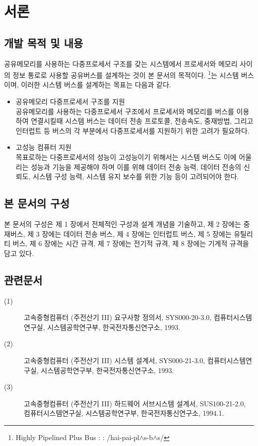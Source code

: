\section{서론}
\subsection{개발 목적 및 내용}
공유메모리를 사용하는 다중프로세서 구조를 갖는 시스템에서 프로세서와 메모리 사이의
정보 통로로 사용할 공유버스를 설계하는 것이 본 문서의 목적이다.
\HB\footnote{Highly Pipelined Plus Bus : \HB :
/hai-pai-pl\'{$\land$}s-b$\land$s/}는 시스템 버스이며,
이러한 시스템 버스를 설계하는 목표는 다음과 같다.
\begin{itemize}
  \item 공유메모리 다중프로세서 구조를 지원 \\
	공유메모리를 사용하는 다중프로세서 구조에서 프로세서와 메모리를 버스를
	이용하여 연결시킬때 시스템 버스는 데이터 전송 프로토콜, 전송속도,
	중재방법, 그리고 인터럽트 등 버스의 각 부분에서 다중프로세서를 지원하기
	위한 고려가 필요하다.
  \item 고성능 컴퓨터 지원 \\
	목표로하는 다중프로세서의 성능이 고성능이기 위해서는 시스템 버스도 이에
	어울리는 성능과 기능을 제공해야 하며 이를 위해 데이터 전송 능력,
	데이터 전송의 신뢰도, 시스템 구성 능력, 시스템 유지 보수를 위한 기능 등이
	고려되어야 한다.
\end{itemize}
\subsection{본 문서의 구성}
본 문서의 구성은 제 1 장에서 전체적인 구성과 설계 개념을 기술하고,
제 2 장에는 중재버스, 제 3 장에는 데이터 전송 버스, 제 4 장에는
인터럽트 버스, 제 5 장에는 유틸리티 버스, 제 6 장에는 시간 규격,
제 7 장에는 전기적 규격, 제 8 장에는 기계적 규격을 담고 있다.
\subsection{관련문서}
\begin{description}
  \item[(1)] 고속중형컴퓨터 (주전산기 III) 요구사항 정의서, SYS000-20-3.0,
	컴퓨터시스템연구실, 시스템공학연구부, 한국전자통신연구소, 1993.
  \item[(2)] 고속중형컴퓨터 (주전산기 III) 시스템 설계서, SYS000-21-3.0,
	컴퓨터시스템연구실, 시스템공학연구부, 한국전자통신연구소, 1993.
  \item[(3)] 고속중형컴퓨터 (주전산기 III) 하드웨어 서브시스템 설계서, SUS100-21-2.0,
	컴퓨터시스템연구실, 시스템공학연구부, 한국전자통신연구소, 1994.1.
\end{description}

